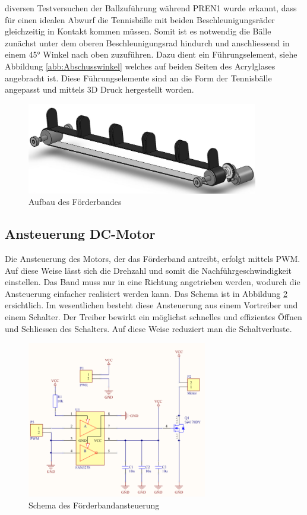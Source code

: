 	diversen Testversuchen der Ballzuführung während PREN1 wurde erkannt, dass 
	für einen idealen Abwurf die Tennisbälle mit beiden Beschleunigungsräder 
	gleichzeitig in Kontakt kommen müssen. Somit ist es notwendig die Bälle 
	zunächst unter dem oberen Beschleunigungsrad hindurch und anschliessend in 
	einem 45\si{\degree} Winkel nach oben zuzuführen. Dazu dient ein Führungselement, 
	siehe Abbildung \ref{abb:Abschusswinkel}
	welches auf beiden Seiten des Acrylglases angebracht ist. Diese 
	Führungselemente sind an die Form der Tennisbälle angepasst und mittels 
	3D Druck hergestellt worden. 
	\begin{figure}[h!]
    	\includegraphics[width=0.9\textwidth,clip,trim=0mm 0mm 0mm 0mm]
    	{Enddokumentation/Bilder/Foerderband.jpg}
    	\centering
    	\caption{Aufbau des Förderbandes}
    	\label{abb:Foerderband}
 	\end{figure}

\subsection{Ansteuerung DC-Motor}
\label{sec:FoerderbandAnsteuerung}
    Die Ansteuerung des Motors, der das Förderband antreibt, erfolgt mittels PWM. Auf diese 
    Weise lässt sich die Drehzahl und somit die Nachführgeschwindigkeit einstellen. Das 
    Band muss nur in eine Richtung angetrieben werden, wodurch die Ansteuerung einfacher 
    realisiert werden kann. Das Schema ist in Abbildung \ref{abb:SchemaAnsteuerung} 
    ersichtlich. Im wesentlichen besteht diese Ansteuerung aus einem Vortreiber und einem 
    Schalter. Der Treiber bewirkt ein möglichst schnelles und effizientes Öffnen und Schliessen des Schalters. Auf diese Weise reduziert man die Schaltverluste. 
    \begin{figure}[h!]
    	\includegraphics[width=0.7\textwidth,clip,trim=0mm 2mm 0mm 7mm]
    	{Enddokumentation/Bilder/Schema_DC-Ansteuerung.png}
    	\centering
    	\caption{Schema des Förderbandansteuerung}
    	\label{abb:SchemaAnsteuerung}
    \end{figure}